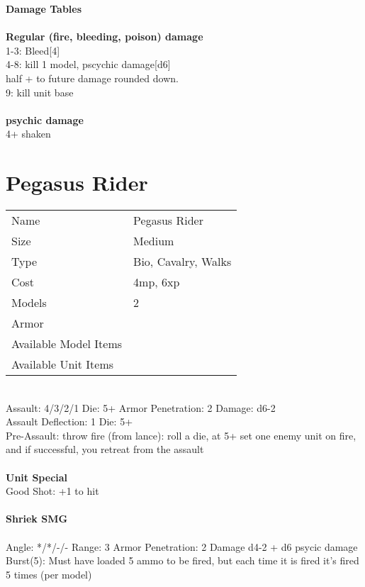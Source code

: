 {\bf Damage Tables} \\
\ \\ {\bf Regular (fire, bleeding, poison) damage } \\
1-3: Bleed[4] \\
4-8: kill 1 model, pscychic damage[d6] \\ half + to future damage rounded down. \\
9: kill unit base \\
\ \\ {\bf psychic damage } \\
4+ shaken \\









\pagebreak

\section{ Pegasus Rider }

\begin{tabular}{ll}
  Name & Pegasus Rider \\
  Size & Medium\\
  Type & Bio, Cavalry, Walks\\
  Cost & 4mp, 6xp\\
  Models & 2\\
  Armor & \\
  Available Model Items &  \\
  Available Unit Items &  \\
\end{tabular}

\ \\
Assault: 4/3/2/1 Die: 5+ Armor Penetration: 2 Damage: d6-2 \\
Assault Deflection: 1 Die: 5+\\
\indent Pre-Assault: throw fire (from lance): roll a die, at 5+ set one enemy unit on fire, and if successful, you retreat from the assault \\
\ \\

{\bf Unit Special} \\
Good Shot: +1 to hit
\ \\
\ \\
{\bf Shriek SMG } \\
\ \\
Angle: */*/-/- Range: 3 Armor Penetration: 2 Damage d4-2 + d6 psycic damage \\
\indent Burst(5): Must have loaded 5 ammo to be fired, but each time it is fired it's fired 5 times (per model) \\





